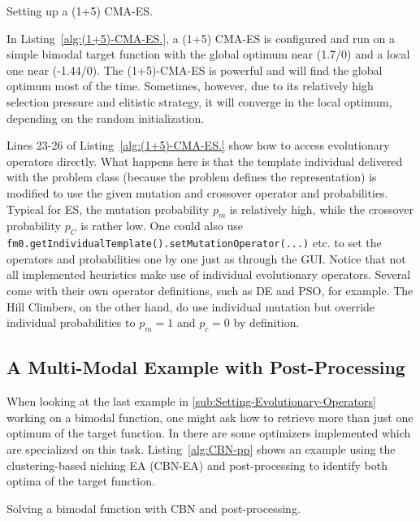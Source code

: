 \begin{algorithm}


\caption{Setting up a (1+5) CMA-ES.\label{alg:(1+5)-CMA-ES.}}
\end{algorithm}


In Listing~\ref{alg:(1+5)-CMA-ES.}, a (1+5) CMA-ES is configured
and run on a simple bimodal target function with the global optimum
near (1.7/0) and a local one near (-1.44/0). The (1+5)-CMA-ES is powerful
and will find the global optimum most of the time. Sometimes, however,
due to its relatively high selection pressure and elitistic strategy,
it will converge in the local optimum, depending on the random initialization.

Lines 23-26 of Listing~\ref{alg:(1+5)-CMA-ES.} show how to access
evolutionary operators directly. What happens here is that the template
individual delivered with the problem class (because the problem defines
the representation) is modified to use the given mutation and crossover
operator and probabilities. Typical for ES, the mutation probability
$p_{m}$ is relatively high, while the crossover probability $p_{C}$
is rather low. One could also use \texttt{fm0.get\-Individual\-Template().set\-Mutation\-Operator(...)}
etc. to set the operators and probabilities one by one just as through
the GUI. Notice that not all implemented heuristics make use of individual
evolutionary operators. Several come with their own operator definitions,
such as DE and PSO, for example. The Hill Climbers, on the other hand,
do use individual mutation but override individual probabilities to
$p_{m}=1$ and $p_{c}=0$ by definition.


\subsection{A Multi-Modal Example with Post-Processing\label{sub:A-Multi-Modal-Example}}

When looking at the last example in \ref{sub:Setting-Evolutionary-Operators}
working on a bimodal function, one might ask how to retrieve more
than just one optimum of the target function. In  there
are some optimizers implemented which are specialized on this task.
Listing~\ref{alg:CBN-pp} shows an example using the clustering-based
niching EA (CBN-EA) \cite{streichertClustering03} and post-processing
to identify both optima of the target function.

\begin{algorithm}


\caption{Solving a bimodal function with CBN and post-processing.\label{alg:CBN-pp}}
\end{algorithm}



